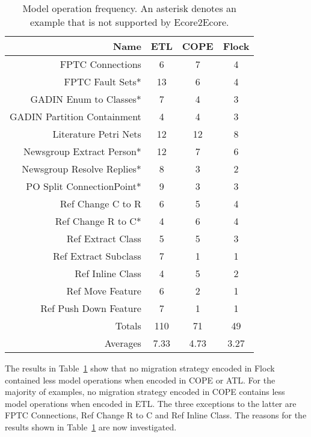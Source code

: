 \begin{table}
	\caption{Model operation frequency. An asterisk denotes an example that is not supported by Ecore2Ecore.}
	\centering
	\begin{tabular}{|r|c|c|c|}
		\hline
		Name       & ETL & COPE & Flock \\
		\hline
		\hline
		FPTC Connections             &  6  &  7  &  4 \\
		\hline
		FPTC Fault Sets*             & 13  &  6  &  4  \\ 
		\hline
		GADIN Enum to Classes*       &  7  &  4  &  3  \\
		\hline                       
		GADIN Partition Containment  &  4  &  4  &  3  \\
		\hline                       
		Literature Petri Nets        & 12  & 12  &  8  \\
		\hline                       
		Newsgroup Extract Person*    & 12  &  7  &  6  \\
		\hline                       
		Newsgroup Resolve Replies*   &  8  &  3  &  2  \\
		\hline                       
		PO Split ConnectionPoint*    &  9  &  3  &  3  \\
		\hline                       
		Ref Change C to R            &  6  &  5  &  4  \\
		\hline                       
		Ref Change R to C*           &  4  &  6  &  4  \\
		\hline                       
		Ref Extract Class            &  5  &  5  &  3  \\
		\hline                       
		Ref Extract Subclass         &  7  &  1  &  1  \\
		\hline                       
		Ref Inline Class             &  4  &  5  &  2  \\
		\hline                       
		Ref Move Feature             &  6  &  2  &  1  \\
		\hline                       
		Ref Push Down Feature        &  7  &  1  &  1  \\
		\hline
		\hline
		Totals                       & 110 & 71  &  49 \\
		\hline
		Averages                     &  7.33  &  4.73  &  3.27 \\
		\hline
	\end{tabular}
	\label{tab:model_operations_results}
\end{table}

The results in Table~\ref{tab:model_operations_results} show that no migration strategy encoded in Flock contained less model operations when encoded in COPE or ATL. For the majority of examples, no migration strategy encoded in COPE contains less model operations when encoded in ETL. The three exceptions to the latter are FPTC Connections, Ref Change R to C and Ref Inline Class. The reasons for the results shown in Table~\ref{tab:model_operations_results} are now investigated.

